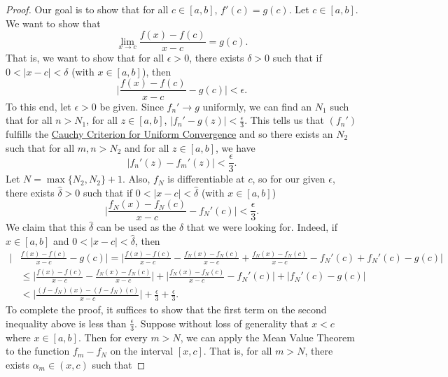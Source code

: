\begin{proof}
    Our goal is to show that for all \( c \in [a,b] \), \( f'(c) = g(c) \). Let \( c \in [a,b] \). We want to show that 
    \[  \lim_{ x \to c  }  \frac{ f(x)  - f(c) }{ x - c  }  = g(c). \]
    That is, we want to show that for all \( \epsilon > 0  \), there exists \( \delta > 0  \) such that if \( 0 < |  x - c  |  < \delta  \) (with \( x \in [a,b] \)), then 
    \[  \Big| \frac{ f(x) - f(c) }{  x - c  }  - g(c) \Big| < \epsilon. \]
    To this end, let \( \epsilon > 0  \) be given. Since \( {f}_{n}' \to g  \) uniformly, we can find an \( {N}_{1} \) such that for all \( n > {N}_{1}  \), for all \( z \in [a,b] \), \( | {f}_{n}' - g(z) |  < \frac{ \epsilon }{ 3 }  \). This tells us that \( ({f}_{n}') \) fulfills the {\hyperref[Cauchy Criterion for Uniform Convergence]{Cauchy Criterion for Uniform Convergence}} and so there exists an \( {N}_{2}  \) such that for all \( m,n > {N}_{2} \) and for all \( z \in [a,b] \), we have  
    \[  | {f}_{n}'(z) - {f}_{m}'(z) |  < \frac{ \epsilon }{ 3 }. \]
    Let \( N = \max \{ {N}_{2}, {N}_{2} \}  + 1  \). Also, \( {f}_{N}  \) is differentiable at \( c  \), so for our given \( \epsilon  \), there exists \( \hat{\delta} > 0  \) such that if \( 0 < |  x - c  |  < \hat{\delta} \) (with \( x \in [a,b] \))  
    \[ \Big| \frac{ {f}_{N}(x) - {f}_{N}(c) }{ x - c  } - {f}_{N}'(c) \Big|  < \frac{ \epsilon }{ 3 }.  \]
    We claim that this \( \hat{\delta} \) can be used as the \( \delta  \) that we were looking for. Indeed, if \( x \in [a,b] \) and \(  0 < |  x - c  |  < \hat{\delta} \), then 
    \begin{align*}
        \Big| &\frac{ f(x) - f(c) }{  x - c  }  - g(c) \Big|  = \Big| \frac{ f(x) - f(c) }{  x - c  } - \frac{ {f}_{N}(x) - {f}_{N}(c) }{  x - c  }  + \frac{ {f}_{N}(x) - {f}_{N}(c) }{  x - c  } - {f}_{N}'(c) + {f}_{N}'(c) - g(c) \Big|   \\
              &\leq \Big| \frac{ f(x) - f(c) }{  x - c  }  - \frac{ {f}_{N}(x) - {f}_{N}(c) }{   x - c  }  \Big|  + \Big| \frac{ {f}_{N}(x)- {f}_{N}(c) }{  x - c  }  - {f}_{N}'(c)  \Big| 
              + | {f}_{N}'(c) - g(c) |  \\
              &< \Big| \frac{ (f - {f}_{N})(x) - (f - {f}_{N})(c) }{  x - c  }  \Big|  + \frac{ \epsilon }{ 3 }  + \frac{ \epsilon }{ 3 }. 
    \end{align*}
    To complete the proof, it suffices to show that the first term on the second inequality above is less than \( \frac{ \epsilon }{ 3 }  \).
    Suppose without loss of generality that \( x < c  \) where \( x \in [a,b] \). Then for every \( m > N  \), we can apply the Mean Value Theorem to the function \( {f}_{m} - {f}_{N} \) on the interval \( [x,c] \). That is, for all \( m > N  \), there exists \( {\alpha}_{m} \in (x,c) \) such that 

\end{proof}
